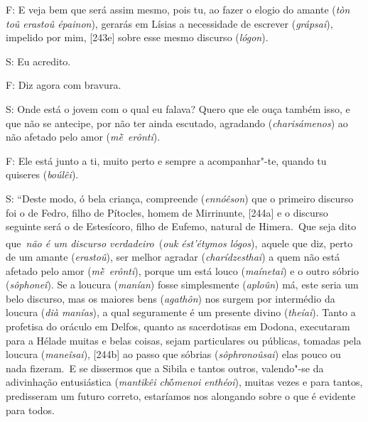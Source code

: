  

F: E veja bem que será assim mesmo, pois tu, ao fazer o elogio do amante
(\emph{tòn toû erastoû épainon}), gerarás em Lísias a necessidade de
escrever (\emph{grápsai}), impelido por mim, [243e] sobre esse mesmo
discurso (\emph{lógon}).

 

S: Eu acredito.

 

F: Diz agora com bravura.

 

S: Onde está o jovem com o qual eu falava? Quero que ele ouça também
isso, e que não se antecipe, por não ter ainda escutado, agradando
(\emph{charisámenos}) ao não afetado pelo amor (\emph{mḕ~erônti}).

 

F: Ele está junto a ti, muito perto e sempre a acompanhar"-te, quando tu
quiseres (\emph{boúlêi}).

 

S: ``Deste modo, ó bela criança, compreende (\emph{ennóêson}) que o
primeiro discurso foi o de Fedro, filho de Pítocles, homem de
Mirrinunte, [244a] e o discurso seguinte será o de Estesícoro, filho
de Eufemo, natural de Himera.~Que seja dito que\emph{~não é um discurso
verdadeiro}~(\emph{ouk ést'étymos lógos}),\textsuperscript{~}aquele que
diz, perto de um amante (\emph{erastoû}), ser melhor agradar
(\emph{charídzesthai}) a quem não está afetado pelo amor
(\emph{mḕ~erônti}), porque um está louco (\emph{maínetai}) e o outro
sóbrio (\emph{sôphoneî}). Se a loucura (\emph{manían}) fosse
simplesmente (\emph{aploûn}) má, este seria um belo discurso, mas os
maiores bens (\emph{agathôn}) nos surgem por intermédio da loucura
(\emph{dià manías}), a qual seguramente é um presente divino
(\emph{theíai}). Tanto a profetisa do oráculo em Delfos, quanto as
sacerdotisas em Dodona, executaram para a Hélade muitas e belas coisas,
sejam particulares ou públicas, tomadas pela loucura (\emph{maneîsai}),
[244b] ao passo que sóbrias (\emph{sôphronoûsai}) elas pouco ou nada
fizeram.~E se dissermos que a Sibila e tantos outros, valendo"-se da
adivinhação entusiástica (\emph{mantikêi ch}ṓ\emph{menoi enthéoi}),
muitas vezes e para tantos, predisseram um futuro correto, estaríamos
nos alongando sobre o que é evidente para todos.

